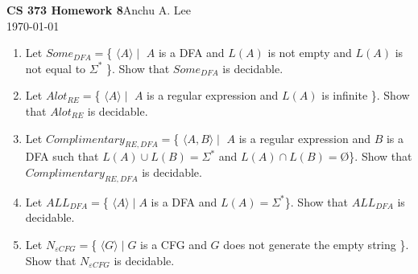 \documentclass{article}
\begin{document}
    \noindent\textbf{CS 373 Homework 8}\hfill Anchu A. Lee\\
    \noindent\today\\
    \begin{enumerate}
        \item Let $Some_{DFA} = $\{ $\langle A \rangle \mid $ $A$ is a DFA and $L(A)$ is 
        not empty and $L(A)$ is not equal to $\Sigma^*$ \}. Show that 
        $Some_{DFA}$ is decidable.
        
        \item Let $Alot_{RE} = $\{ $\langle A \rangle \mid $ $A$ is a regular expression 
        and $L(A)$ is infinite \}. Show that $Alot_{RE}$ is decidable.

        \item Let $Complimentary_{RE,DFA} = $\{ $\langle A, B \rangle \mid $ $A$ is a 
        regular expression and $B$ is a DFA such that $L(A) \cup L(B) = \Sigma^*$ and 
        $L(A) \cap L(B) = $\O \}. Show that $Complimentary_{RE,DFA}$ is decidable.

        \item Let $ALL_{DFA} = $\{ $\langle A \rangle \mid A$ is a DFA and $L(A) = 
        \Sigma^* $\}. Show that $ALL_{DFA}$ is decidable.

        \item Let $N_{\varepsilon CFG} = $\{ $\langle G \rangle \mid G$ is a CFG and $G$ 
        does not generate the empty string \}. Show that $N_{\varepsilon CFG}$ is 
        decidable.


\end{enumerate}
\end{document}
